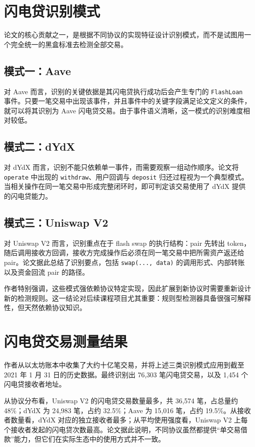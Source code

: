 \documentclass[UTF8,11pt]{ctexart}
\begin{document}
\section{闪电贷识别模式}
论文的核心贡献之一，是根据不同协议的实现特征设计识别模式，而不是试图用一个完全统一的黑盒标准去检测全部交易。

\subsection{模式一：Aave}
对 Aave 而言，识别的关键依据是其闪电贷执行成功后会产生专门的 \texttt{FlashLoan} 事件。只要一笔交易中出现该事件，并且事件中的关键字段满足论文定义的条件，就可以将其识别为 Aave 闪电贷交易。由于事件语义清晰，这一模式的识别难度相对较低。

\subsection{模式二：dYdX}
对 dYdX 而言，识别不能只依赖单一事件，而需要观察一组动作顺序。论文将 \texttt{operate} 中出现的 \texttt{withdraw}、用户回调与 \texttt{deposit} 归还过程视为一个典型模式。当相关操作在同一笔交易中形成完整闭环时，即可判定该交易使用了 dYdX 提供的闪电贷能力。

\subsection{模式三：Uniswap V2}
对 Uniswap V2 而言，识别重点在于 flash swap 的执行结构：pair 先转出 token，随后调用接收方回调，接收方完成操作后必须在同一笔交易中把所需资产返还给 pair。论文据此总结了识别要点，包括 \texttt{swap(..., data)} 的调用形式、内部转账以及资金回流 pair 的路径。

作者特别强调，这些模式强依赖协议特定实现，因此扩展到新协议时需要重新设计新的检测规则。这一结论对后续课程项目尤其重要：规则型检测器具备很强可解释性，但天然依赖协议知识。

\section{闪电贷交易测量结果}
作者从以太坊账本中收集了大约十亿笔交易，并将上述三类识别模式应用到截至 2021 年 1 月 31 日的历史数据。最终识别出 76,303 笔闪电贷交易，以及 1,454 个闪电贷接收者地址。

从协议分布看，Uniswap V2 的闪电贷交易数量最多，共 36,574 笔，占总量约 48\%；dYdX 为 24,983 笔，占约 32.5\%；Aave 为 15,016 笔，占约 19.5\%。从接收者数量看，dYdX 对应的独立接收者最多；从平均使用强度看，Uniswap V2 上每个接收者发起的闪电贷次数最高。论文据此说明，不同协议虽然都提供“单交易借款”能力，但它们在实际生态中的使用方式并不一致。
\end{document}
